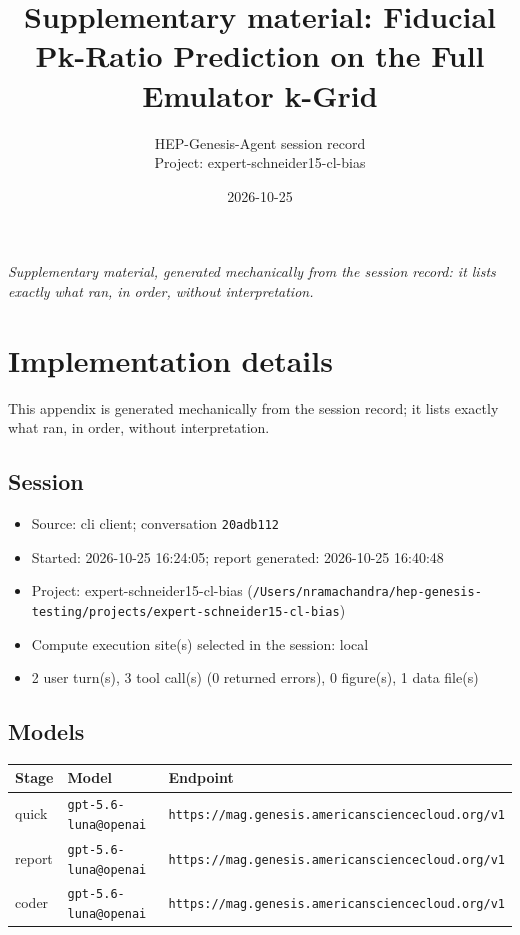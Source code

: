 \documentclass[11pt,a4paper]{article}
\title{Supplementary material: Fiducial Pk-Ratio Prediction on the Full Emulator k-Grid}
\author{HEP-Genesis-Agent session record \\ \small Project: expert-schneider15-cl-bias}
\date{2026-10-25}
\begin{document}
\maketitle
\noindent\textit{\small Supplementary material, generated mechanically from the session record: it lists exactly what ran, in order, without interpretation.}
\vspace{1em}



\appendix
\section{Implementation details}
\label{app:impl}
This appendix is generated mechanically from the session record; it lists exactly what ran, in order, without interpretation.
\subsection{Session}
\begin{itemize}
  \item Source: cli client; conversation \texttt{20adb112}
  \item Started: 2026-10-25 16:24:05; report generated: 2026-10-25 16:40:48
  \item Project: expert-schneider15-cl-bias (\texttt{/\allowbreak{}Users/\allowbreak{}nramachandra/\allowbreak{}hep-genesis-testing/\allowbreak{}projects/\allowbreak{}expert-schneider15-cl-bias})
  \item Compute execution site(s) selected in the session: local
  \item 2 user turn(s), 3 tool call(s) (0 returned errors), 0 figure(s), 1 data file(s)
\end{itemize}
\subsection{Models}
\begin{longtable}{@{}p{}p{}p{}@{}}
\toprule Stage & Model & Endpoint \\ \midrule \endhead
quick & \texttt{gpt-5.6-luna@openai} & \texttt{https:\allowbreak{}/\allowbreak{}/\allowbreak{}mag.genesis.americansciencecloud.org/\allowbreak{}v1} \\
report & \texttt{gpt-5.6-luna@openai} & \texttt{https:\allowbreak{}/\allowbreak{}/\allowbreak{}mag.genesis.americansciencecloud.org/\allowbreak{}v1} \\
coder & \texttt{gpt-5.6-luna@openai} & \texttt{https:\allowbreak{}/\allowbreak{}/\allowbreak{}mag.genesis.americansciencecloud.org/\allowbreak{}v1} \\
\bottomrule\end{longtable}
\end{document}
